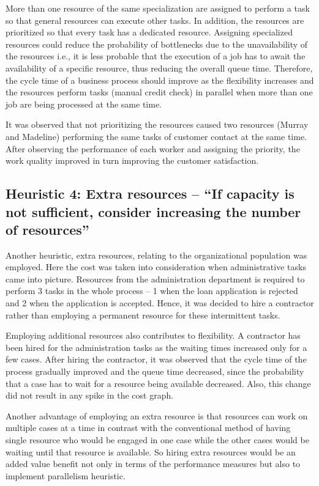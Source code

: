\documentclass[a4paper]{article} %
\begin{document}
More than one resource of the same specialization are assigned to perform a task so that general resources can execute other tasks. In addition, the resources are prioritized so that every task has a dedicated resource. Assigning specialized resources could reduce the probability of bottlenecks due to the unavailability of the resources i.e., it is less probable that the execution of a job has to await the availability of a specific resource, thus reducing the overall queue time. Therefore, the cycle time of a business process should improve as the flexibility increases and the resources perform tasks (manual credit check) in parallel when more than one job are being processed at the same time.

It was observed that not prioritizing the resources caused two resources (Murray and Madeline) performing the same tasks of customer contact at the same time. After observing the performance of each worker and assigning the priority, the work quality improved in turn improving the customer satisfaction.\\

\subsection{Heuristic 4: Extra resources – “If capacity is not sufficient, consider increasing the number of resources”}
Another heuristic, extra resources, relating to the organizational population was employed. Here the cost was taken into consideration when administrative tasks came into picture. Resources from the administration department is required to perform 3 tasks in the whole process – 1 when the loan application is rejected and 2 when the application is accepted. Hence, it was decided to hire a contractor rather than employing a permanent resource for these intermittent tasks.

Employing additional resources also contributes to flexibility. A contractor has been hired for the administration tasks as the waiting times increased only for a few cases. After hiring the contractor, it was observed that the cycle time of the process gradually improved and the queue time decreased, since the probability that a case has to wait for a resource being available decreased. Also, this change did not result in any spike in the cost graph.

Another advantage of employing an extra resource is that resources can work on multiple cases at a time in contrast with the conventional method of having single resource who would be engaged in one case while the other cases would be waiting until that resource is available. So hiring extra resources would be an added value benefit not only in terms of the performance measures but also to implement parallelism heuristic.
\end{document}
